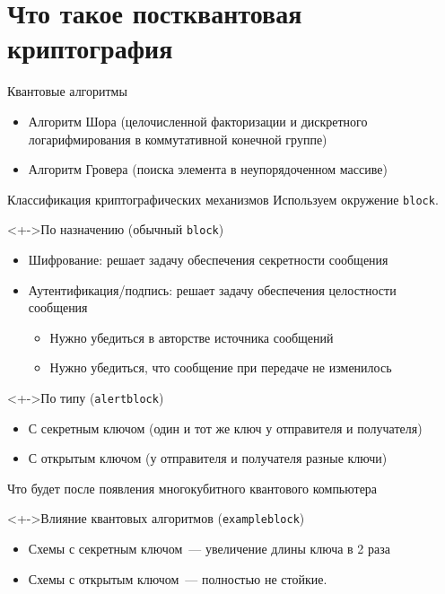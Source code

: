 \documentclass[aspectratio=169, 12pt]{beamer}
\begin{document}
\section{Что такое постквантовая криптография}
\label{sec:orgbb109c6}
\begin{frame}[label={sec:orge975f3b}]{Квантовые алгоритмы}
    \begin{itemize}[<+->]
        \item Алгоритм Шора (целочисленной факторизации и дискретного логарифмирования в коммутативной конечной группе)
        \item Алгоритм Гровера (поиска элемента в неупорядоченном массиве)
    \end{itemize}
\end{frame}
\begin{frame}[label={sec:org9c1d5f5},fragile]{Классификация криптографических механизмов}
    Используем окружение \texttt{block}.
    \begin{block}<+->{По назначению (обычный \texttt{block})}
        \begin{itemize}[<+->]
            \item Шифрование: решает задачу обеспечения секретности сообщения
            \item Аутентификация/подпись: решает задачу обеспечения целостности сообщения
                  \begin{itemize}
                      \item Нужно убедиться в авторстве источника сообщений
                      \item Нужно убедиться, что сообщение при передаче не изменилось
                  \end{itemize}
        \end{itemize}
    \end{block}
    \begin{alertblock}<+->{По типу (\texttt{alertblock})}
        \begin{itemize}[<+->]
            \item С секретным ключом (один и тот же ключ у отправителя и получателя)
            \item С открытым ключом (у отправителя и получателя \alert{разные} ключи)
        \end{itemize}
    \end{alertblock}
\end{frame}
\begin{frame}[label={sec:org39ff659},fragile]{Что будет после появления многокубитного квантового компьютера}
    \begin{exampleblock}<+->{Влияние квантовых алгоритмов (\texttt{exampleblock})}\label{sec:orga9ccb4f}
        \begin{itemize}[<+->]
            \item Схемы с секретным ключом~--- увеличение длины ключа в 2 раза
            \item \alert{Схемы с открытым ключом}~--- полностью не стойкие.
        \end{itemize}
    \end{exampleblock}
\end{frame}
\end{document}
